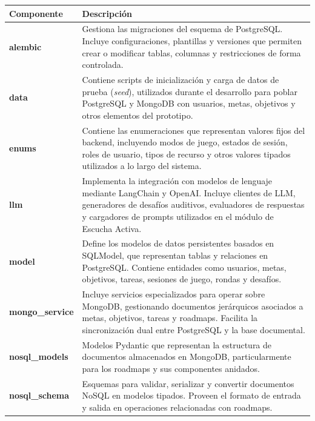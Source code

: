 \begin{table}[H]
\centering
\footnotesize
\setlength{\tabcolsep}{8pt}
\renewcommand{\arraystretch}{1.25}
\begin{tabular}{|p{3cm}|p{11cm}|}
\hline
\textbf{Componente} & \textbf{Descripción} \\
\hline

\textbf{alembic} &
Gestiona las migraciones del esquema de PostgreSQL. Incluye configuraciones, plantillas y
versiones que permiten crear o modificar tablas, columnas y restricciones de forma controlada. \\
\hline

\textbf{data} &
Contiene scripts de inicialización y carga de datos de prueba (\textit{seed}), utilizados durante el
desarrollo para poblar PostgreSQL y MongoDB con usuarios, metas, objetivos y otros elementos
del prototipo. \\
\hline

\textbf{enums} &
Contiene las enumeraciones que representan valores fijos del backend, incluyendo modos de juego, estados de sesión, roles de usuario, tipos de recurso y otros valores tipados utilizados a lo largo del sistema. \\
\hline

\textbf{llm} &
Implementa la integración con modelos de lenguaje mediante LangChain y OpenAI. Incluye
clientes de LLM, generadores de desafíos auditivos, evaluadores de respuestas y cargadores de
prompts utilizados en el módulo de Escucha Activa. \\
\hline

\textbf{model} &
Define los modelos de datos persistentes basados en SQLModel, que representan tablas y
relaciones en PostgreSQL. Contiene entidades como usuarios, metas, objetivos, tareas, sesiones
de juego, rondas y desafíos. \\
\hline

\textbf{mongo\_service} &
Incluye servicios especializados para operar sobre MongoDB, gestionando documentos
jerárquicos asociados a metas, objetivos, tareas y roadmaps. Facilita la sincronización dual entre
PostgreSQL y la base documental. \\
\hline

\textbf{nosql\_models} &
Modelos Pydantic que representan la estructura de documentos almacenados en MongoDB,
particularmente para los roadmaps y sus componentes anidados. \\
\hline

\textbf{nosql\_schema} &
Esquemas para validar, serializar y convertir documentos NoSQL en modelos tipados. Proveen
el formato de entrada y salida en operaciones relacionadas con roadmaps. \\
\hline


\end{tabular}
\end{table}
